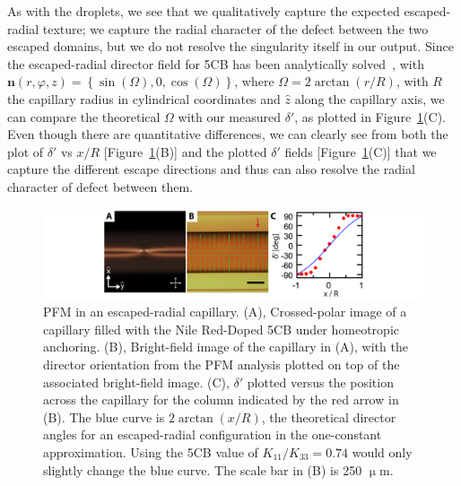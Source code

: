 As with the droplets, we see that we qualitatively capture the expected escaped-radial texture; we capture the radial character of the defect between the two escaped domains, but we do not resolve the singularity itself in our output.
Since the escaped-radial director field for 5CB has been analytically solved~\cite{RN289,RN290}, with $\mathbf{n}(r,\varphi,z) = \left \{ \sin(\Omega), 0, \cos(\Omega)   \right \}$, where $\Omega = 2 \arctan(r/R) $, with $R$ the capillary radius in cylindrical coordinates and $\hat{z}$ along the capillary axis, we can compare the theoretical $\Omega$ with our measured $\delta'$, as plotted in Figure~\ref{f:5-PFM_Capillary}(C).
Even though there are quantitative differences, we can clearly see from both the plot of $\delta'$ vs $x/R$ [Figure~\ref{f:5-PFM_Capillary}(B)] and the plotted $\delta'$ fields [Figure~\ref{f:5-PFM_Capillary}(C)] that we capture the different escape directions and thus can also resolve the radial character of defect between them.
\begin{figure}
  \centering
  \includegraphics{figures/C5/Ch5-Figs_PFM_Capillary.png}
  \caption{PFM in an escaped-radial capillary.
  (A), Crossed-polar image of a capillary filled with the Nile Red-Doped 5CB under homeotropic anchoring.
  (B), Bright-field image of the capillary in (A), with the director orientation from the PFM analysis plotted on top of the associated bright-field image.
  (C), $\delta'$ plotted versus the position across the capillary for the column indicated by the red arrow in (B).
  The blue curve is $2 \arctan (x/R)$, the theoretical director angles for an escaped-radial configuration in the one-constant approximation.
  Using the 5CB value of $K_{11}/K_{33} = 0.74$ would only slightly change the blue curve.
  The scale bar in (B) is 250 $\upmu$m.}\label{f:5-PFM_Capillary}
\end{figure}

